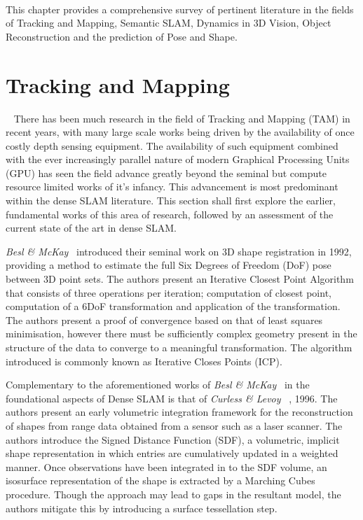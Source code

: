 ~\label{chap:lit_review}
\begin{chapterabstract}
This chapter provides a comprehensive survey of pertinent literature in the fields 
of Tracking and Mapping, Semantic SLAM, Dynamics in 3D Vision, Object Reconstruction 
and the prediction of Pose and Shape.
\end{chapterabstract}

\section{Tracking and Mapping}
~\label{sec:lit_review_tam}
There has been much research in the field of Tracking and Mapping (TAM) in recent 
years, with many large scale works being driven by the availability of once 
costly depth sensing equipment. The availability of such equipment combined 
with the ever increasingly parallel nature of modern Graphical Processing Units (GPU) has 
seen the field advance greatly beyond the seminal but compute resource limited works of it's 
infancy. This advancement is most predominant within the dense SLAM literature. 
This section shall first explore the earlier, fundamental works of this area of research, 
followed by an assessment of the current state of the art in dense SLAM\@.

\textit{Besl \& McKay}~\cite{Besl1992} introduced their seminal work on 3D shape 
registration in 1992, providing a method to estimate the full Six Degrees of 
Freedom (DoF) pose between 3D point sets. The authors present an Iterative Closest 
Point Algorithm that consists of three operations per iteration; computation 
of closest point, computation of a 6DoF transformation and application of 
the transformation. The authors present a proof of convergence based on that 
of least squares minimisation, however there must be sufficiently complex 
geometry present in the structure of the data to converge to a meaningful 
transformation. The algorithm introduced is commonly known as Iterative Closes Points (ICP).

Complementary to the aforementioned works of \textit{Besl \& McKay}~\cite{Besl1992} 
in the foundational aspects of Dense SLAM is that of \textit{Curless \& Levoy} 
~\cite{Curless1996}, 1996. The authors present an early volumetric integration 
framework for the reconstruction of shapes from range data obtained from a 
sensor such as a laser scanner. The authors introduce the Signed Distance Function (SDF), 
a volumetric, implicit shape representation in which entries are cumulatively updated 
in a weighted manner. Once observations have been integrated in to the SDF volume, an 
isosurface representation of the shape is extracted by a Marching Cubes~\cite{Lorensen1987} 
procedure. Though the approach may lead to gaps in the resultant model, the authors 
mitigate this by introducing a surface tessellation step.

